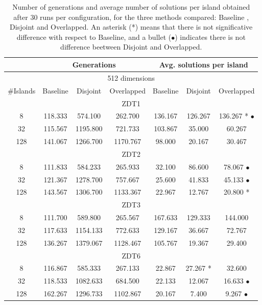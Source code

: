 \documentclass[runningheads,a4paper]{llncs}
\begin{document}
\begin{table}
\begin{tabular}{|c||c|c|c||c|c|c||}
																			
																			
	&	\multicolumn{3}{|c|}{Generations}								&	\multicolumn{3}{|c|}{Avg. solutions per island}								\\ \hline
\multicolumn{7}{|c|}{512 dimensions}																			\\ \hline
\#Islands	&	Baseline	&	Disjoint	&		Overlapped			&	Baseline	&	Disjoint		&	Overlapped			\\ \hline
\multicolumn{7}{|c|}{ZDT1}																			\\ \hline
8	&	118.333	&	574.100		&	262.700			&	136.167	&	126.267		&	136.267	*	$\bullet$	\\
32	&	115.567	&	1195.800		&	721.733			&	103.867	&	35.000		&	60.267			\\
128	&	141.067	&	1266.700		&	1170.767			&	98.000	&	20.167		&	30.467			\\ \hline
\multicolumn{7}{|c|}{ZDT2}																			\\ \hline
8	&	111.833	&	584.233		&	265.933			&	32.100	&	86.600		&	78.067		$\bullet$	\\
32	&	121.367	&	1278.700		&	757.667			&	25.600	&	41.833		&	45.133		$\bullet$	\\
128	&	143.567	&	1306.700		&	1133.367			&	22.967	&	12.767		&	20.800	*		\\ \hline
\multicolumn{7}{|c|}{ZDT3}																			\\ \hline
8	&	111.700	&	589.800		&	265.567			&	167.633	&	129.333		&	144.000			\\
32	&	117.633	&	1154.133		&	772.633			&	129.167	&	36.667		&	72.767			\\
128	&	136.267	&	1379.067		&	1128.467			&	105.767	&	19.367		&	29.400			\\ \hline
\multicolumn{7}{|c|}{ZDT6}																			\\ \hline
8	&	116.867	&	585.333		&	267.133			&	22.867	&	27.267	*	&	32.600			\\
32	&	118.533	&	1082.633		&	684.500			&	22.133	&	12.067		&	16.633		$\bullet$	\\
128	&	162.267	&	1296.733		&	1102.867			&	20.167	&	7.400		&	9.267		$\bullet$	\\ \hline



\end{tabular}
\caption{Number of generations and average number of solutions per island obtained after 30 runs per configuration, for the three methods compared: Baseline , Disjoint and Overlapped. An asterisk (*) means that there is not significative difference with respect to Baseline, and a bullet ($\bullet$) indicates there is not difference beetween Disjoint and Overlapped.}
\end{table}
\end{document}
